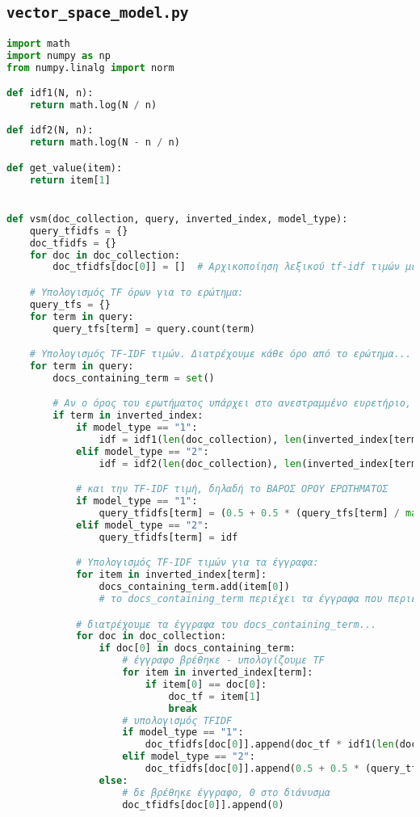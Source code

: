 \subsection{\texttt{vector\_space\_model.py}}
\begin{lstlisting}[language=Python]
import math
import numpy as np
from numpy.linalg import norm

def idf1(N, n):
    return math.log(N / n)

def idf2(N, n):
    return math.log(N - n / n)

def get_value(item):
    return item[1]


def vsm(doc_collection, query, inverted_index, model_type):
    query_tfidfs = {}
    doc_tfidfs = {}
    for doc in doc_collection:
        doc_tfidfs[doc[0]] = []  # Αρχικοποίηση λεξικού tf-idf τιμών με άδειες λίστες για κάθε έγγραφο

    # Υπολογισμός TF όρων για το ερώτημα:
    query_tfs = {}
    for term in query:
        query_tfs[term] = query.count(term)

    # Υπολογισμός TF-IDF τιμών. Διατρέχουμε κάθε όρο από το ερώτημα...
    for term in query:
        docs_containing_term = set()

        # Αν ο όρος του ερωτήματος υπάρχει στο ανεστραμμένο ευρετήριο, υπολογίζουμε την IDF τιμή του.
        if term in inverted_index:
            if model_type == "1":
                idf = idf1(len(doc_collection), len(inverted_index[term]))
            elif model_type == "2":
                idf = idf2(len(doc_collection), len(inverted_index[term]))

            # και την TF-IDF τιμή, δηλαδή το ΒΑΡΟΣ ΟΡΟΥ ΕΡΩΤΗΜΑΤΟΣ
            if model_type == "1":
                query_tfidfs[term] = (0.5 + 0.5 * (query_tfs[term] / max(query_tfs.values()))) * idf
            elif model_type == "2":
                query_tfidfs[term] = idf

            # Υπολογισμός TF-IDF τιμών για τα έγγραφα:
            for item in inverted_index[term]:
                docs_containing_term.add(item[0])
                # το docs_containing_term περιέχει τα έγγραφα που περιέχουν τον συγκεκριμένο όρο.

            # διατρέχουμε τα έγγραφα του docs_containing_term...
            for doc in doc_collection:
                if doc[0] in docs_containing_term:
                    # έγγραφο βρέθηκε - υπολογίζουμε TF
                    for item in inverted_index[term]:
                        if item[0] == doc[0]:
                            doc_tf = item[1]
                            break
                    # υπολογισμός TFIDF
                    if model_type == "1":
                        doc_tfidfs[doc[0]].append(doc_tf * idf1(len(doc_collection), len(inverted_index[term])))
                    elif model_type == "2":
                        doc_tfidfs[doc[0]].append(0.5 + 0.5 * (query_tfs[term] / max(query_tfs.values())))
                else:
                    # δε βρέθηκε έγγραφο, 0 στο διάνυσμα
                    doc_tfidfs[doc[0]].append(0)


\end{lstlisting}
